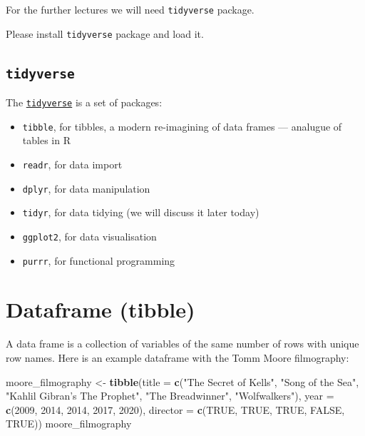 \documentclass[
]{book}
\makeatletter
\newenvironment{Shaded}{\begin{snugshade}}{\end{snugshade}}
\newcommand{\DataTypeTok}[1]{\textcolor[rgb]{0.13,0.29,0.53}{#1}}
\newcommand{\DecValTok}[1]{\textcolor[rgb]{0.00,0.00,0.81}{#1}}
\newcommand{\KeywordTok}[1]{\textcolor[rgb]{0.13,0.29,0.53}{\textbf{#1}}}
\newcommand{\NormalTok}[1]{#1}
\newcommand{\OtherTok}[1]{\textcolor[rgb]{0.56,0.35,0.01}{#1}}
\newcommand{\StringTok}[1]{\textcolor[rgb]{0.31,0.60,0.02}{#1}}
\providecommand{\tightlist}{%
  \setlength{\itemsep}{0pt}\setlength{\parskip}{0pt}}
\newenvironment{kframe}{%
\medskip{}
\setlength{\fboxsep}{.8em}
 \def\at@end@of@kframe{}%
 \ifinner\ifhmode%
  \def\at@end@of@kframe{\end{minipage}}%
  \begin{minipage}{\columnwidth}%
 \fi\fi%
 \def\FrameCommand##1{\hskip\@totalleftmargin \hskip-\fboxsep
 \colorbox{shadecolor}{##1}\hskip-\fboxsep
     \hskip-\linewidth \hskip-\@totalleftmargin \hskip\columnwidth}%
 \MakeFramed {\advance\hsize-\width
   \@totalleftmargin\z@ \linewidth\hsize
   \@setminipage}}%
 {\par\unskip\endMakeFramed%
 \at@end@of@kframe}
\newenvironment{rmdblock}[1]
  {
  \begin{itemize}
  \renewcommand{\labelitemi}{
    \raisebox{-.7\height}[0pt][0pt]{
      {\setkeys{Gin}{width=3em,keepaspectratio}\texttt{[image: images/\#1]}}
    }
  }
  \setlength{\fboxsep}{1em}
  \begin{kframe}
  \item
  }
  {
  \end{kframe}
  \end{itemize}
  }
\newenvironment{rmdtask}
  {\begin{rmdblock}{task}}
  {\end{rmdblock}}
\makeatother
\begin{document}
For the further lectures we will need \texttt{tidyverse} package.

\begin{rmdtask}
Please install \texttt{tidyverse} package and load it.
\end{rmdtask}

\hypertarget{tidyverse}{%
\subsection{\texorpdfstring{\texttt{tidyverse}}{tidyverse}}\label{tidyverse}}

The \href{https://blog.rstudio.org/2016/09/15/tidyverse-1-0-0/}{\texttt{tidyverse}} is a set of packages:

\begin{itemize}
\tightlist
\item
  \texttt{tibble}, for tibbles, a modern re-imagining of data frames --- analugue of tables in R
\item
  \texttt{readr}, for data import
\item
  \texttt{dplyr}, for data manipulation
\item
  \texttt{tidyr}, for data tidying (we will discuss it later today)
\item
  \texttt{ggplot2}, for data visualisation
\item
  \texttt{purrr}, for functional programming
\end{itemize}

\hypertarget{dataframe-tibble}{%
\section{Dataframe (tibble)}\label{dataframe-tibble}}

A data frame is a collection of variables of the same number of rows with unique row names. Here is an example dataframe with the Tomm Moore filmography:

\begin{Shaded}
\begin{Highlighting}[]
\NormalTok{moore_filmography <-}\StringTok{ }\KeywordTok{tibble}\NormalTok{(}\DataTypeTok{title =} \KeywordTok{c}\NormalTok{(}\StringTok{"The Secret of Kells"}\NormalTok{, }
                                      \StringTok{"Song of the Sea"}\NormalTok{, }
                                      \StringTok{"Kahlil Gibran's The Prophet"}\NormalTok{, }
                                      \StringTok{"The Breadwinner"}\NormalTok{, }
                                      \StringTok{"Wolfwalkers"}\NormalTok{),}
                            \DataTypeTok{year =} \KeywordTok{c}\NormalTok{(}\DecValTok{2009}\NormalTok{, }\DecValTok{2014}\NormalTok{, }\DecValTok{2014}\NormalTok{, }\DecValTok{2017}\NormalTok{, }\DecValTok{2020}\NormalTok{),}
                            \DataTypeTok{director =} \KeywordTok{c}\NormalTok{(}\OtherTok{TRUE}\NormalTok{, }\OtherTok{TRUE}\NormalTok{, }\OtherTok{TRUE}\NormalTok{, }\OtherTok{FALSE}\NormalTok{, }\OtherTok{TRUE}\NormalTok{))}
\NormalTok{moore_filmography}
\end{Highlighting}
\end{Shaded}
\end{document}
